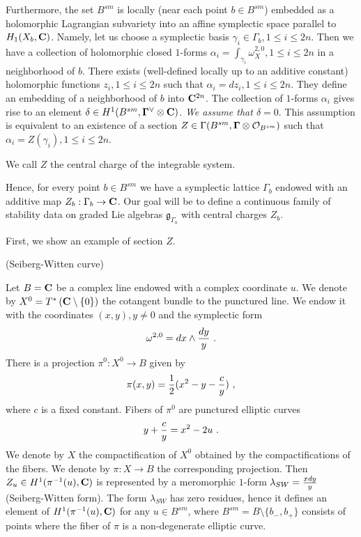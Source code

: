 \documentclass[12pt]{article}
\begin{document}
Furthermore, the set $B^{sm}$ is locally (near each point $b\in B^{sm}$) embedded as a holomorphic Lagrangian subvariety into an affine symplectic space parallel to $H_1(X_b,{\bf C})$. Namely, let us choose a symplectic basis $\gamma_i\in \Gamma_b, 1\le i\le 2n$. Then we have a collection of holomorphic closed
$1$-forms $\alpha_i=\int_{\gamma_i}\omega^{2,0}_X, 1\le i\le 2n$ in a neighborhood of $b$. There exists (well-defined locally up to an additive constant) holomorphic functions $z_i, 1\le i\le 2n$ such that $\alpha_i=dz_i, 1\le i\le 2n$. They define an embedding of a neighborhood of $b$ into ${\bf C}^{2n}$. The collection of $1$-forms $\alpha_i$ gives rise to an element $\delta\in H^1(B^{sm}, {\bf \Gamma}^{\vee}\otimes {\bf C})$. {\it We  assume that $\delta=0$}.
This assumption is equivalent to an existence of a section
$Z\in \Gamma(B^{sm},{\bf \Gamma}\otimes {\cal O}_{B^{sm}})$ such that $\alpha_i=Z(\gamma_i), 1\le i\le 2n$.
\begin{defn} We call $Z$ the central charge of the integrable system.

\end{defn}


Hence, for every point $b\in B^{sm}$ we have a symplectic lattice $\Gamma_b$ endowed with an additive map
$Z_b:\Gamma_b\to {\bf C}$. Our goal will be to define a continuous family of stability data on graded Lie algebras
  $\mathfrak{g}_{\Gamma_b}$ with central charges $Z_b$.

First, we show an example of section $Z$.
\begin{exa} (Seiberg-Witten curve)

Let $B={\bf C}$ be a complex line endowed with a complex coordinate $u$. We denote by $X^0=T^{\ast}\left({\bf C}\setminus\{0\}\right)$ the cotangent bundle to the punctured line. We endow it with the coordinates $(x,y), y\ne 0$ and the symplectic form 
$$\omega^{2,0}=dx\wedge{dy\over{y}}\,\,.$$ There is a projection $\pi^0:X^0\to B$ given by 
$$\pi(x,y)={1\over{2}}(x^2-y-{c\over{y}})\,\,,$$
 where $c$ is a fixed constant. Fibers of $\pi^0$ are punctured elliptic curves 
$$y+{c\over{y}}=x^2-2u\,\,.$$ We denote by $X$ the compactification of $X^0$ obtained by the compactifications of the fibers. We denote by $\pi:X\to B$ the corresponding projection. Then $Z_u\in H^1(\pi^{-1}(u),{\bf C})$ is represented by a meromorphic $1$-form $\lambda_{SW}={xdy\over{y}}$ (Seiberg-Witten form). The form $\lambda_{SW}$ has zero residues, hence it defines an element of $H^1(\pi^{-1}(u),{\bf C})$ for any $u\in B^{sm}$, where $B^{sm}=B\setminus\{b_{-},b_{+}\}$ consists of points where the fiber of $\pi$ is a
non-degenerate elliptic curve.


\end{exa}
\end{document}
